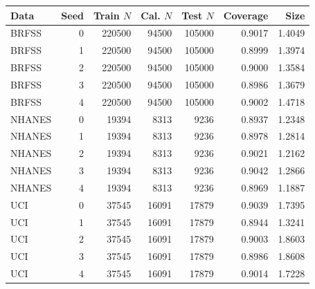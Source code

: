 \begin{tabular}{lrrrrrr}
\toprule
Data & Seed & Train $N$ & Cal. $N$ & Test $N$ & Coverage & Size \\
\midrule
BRFSS & 0 & 220500 & 94500 & 105000 & 0.9017 & 1.4049 \\
BRFSS & 1 & 220500 & 94500 & 105000 & 0.8999 & 1.3974 \\
BRFSS & 2 & 220500 & 94500 & 105000 & 0.9000 & 1.3584 \\
BRFSS & 3 & 220500 & 94500 & 105000 & 0.8986 & 1.3679 \\
BRFSS & 4 & 220500 & 94500 & 105000 & 0.9002 & 1.4718 \\
NHANES & 0 & 19394 & 8313 & 9236 & 0.8937 & 1.2348 \\
NHANES & 1 & 19394 & 8313 & 9236 & 0.8978 & 1.2814 \\
NHANES & 2 & 19394 & 8313 & 9236 & 0.9021 & 1.2162 \\
NHANES & 3 & 19394 & 8313 & 9236 & 0.9042 & 1.2866 \\
NHANES & 4 & 19394 & 8313 & 9236 & 0.8969 & 1.1887 \\
UCI & 0 & 37545 & 16091 & 17879 & 0.9039 & 1.7395 \\
UCI & 1 & 37545 & 16091 & 17879 & 0.8944 & 1.3241 \\
UCI & 2 & 37545 & 16091 & 17879 & 0.9003 & 1.8603 \\
UCI & 3 & 37545 & 16091 & 17879 & 0.8986 & 1.8608 \\
UCI & 4 & 37545 & 16091 & 17879 & 0.9014 & 1.7228 \\
\bottomrule
\end{tabular}
